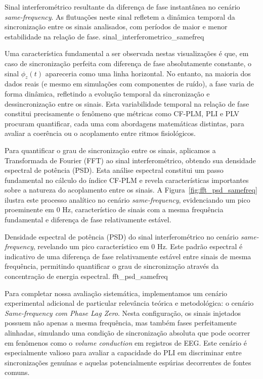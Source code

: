 {Sinal interferométrico resultante da diferença de fase instantânea no cenário \textit{same-frequency}. As flutuações neste sinal refletem a dinâmica temporal da sincronização entre os sinais analisados, com períodos de maior e menor estabilidade na relação de fase.}
{sinal_interferometrico_samefreq}

Uma característica fundamental a ser observada nestas visualizações é que, em caso de sincronização perfeita com diferença de fase absolutamente constante, o sinal \(\phi_z(t)\) apareceria como uma linha horizontal. No entanto, na maioria dos dados reais (e mesmo em simulações com componentes de ruído), a fase varia de forma dinâmica, refletindo a evolução temporal da sincronização e dessincronização entre os sinais. Esta variabilidade temporal na relação de fase constitui precisamente o fenômeno que métricas como CF-PLM, PLI e PLV procuram quantificar, cada uma com abordagens matemáticas distintas, para avaliar a coerência ou o acoplamento entre ritmos fisiológicos.

Para quantificar o grau de sincronização entre os sinais, aplicamos a Transformada de Fourier (FFT) ao sinal interferométrico, obtendo sua densidade espectral de potência (PSD). Esta análise espectral constitui um passo fundamental no cálculo do índice CF-PLM e revela características importantes sobre a natureza do acoplamento entre os sinais. A Figura~\ref{fig:fft_psd_samefreq} ilustra este processo analítico no cenário \textit{same-frequency}, evidenciando um pico proeminente em 0 Hz, característico de sinais com a mesma frequência fundamental e diferença de fase relativamente estável.

{Densidade espectral de potência (PSD) do sinal interferométrico no cenário \textit{same-frequency}, revelando um pico característico em 0 Hz. Este padrão espectral é indicativo de uma diferença de fase relativamente estável entre sinais de mesma frequência, permitindo quantificar o grau de sincronização através da concentração de energia espectral.}
{fft_psd_samefreq}

Para completar nossa avaliação sistemática, implementamos um cenário experimental adicional de particular relevância teórica e metodológica: o cenário \textit{Same-frequency com Phase Lag Zero}. Nesta configuração, os sinais injetados possuem não apenas a mesma frequência, mas também fases perfeitamente alinhadas, simulando uma condição de sincronização absoluta que pode ocorrer em fenômenos como o \textit{volume conduction} em registros de EEG. Este cenário é especialmente valioso para avaliar a capacidade do PLI em discriminar entre sincronizações genuínas e aquelas potencialmente espúrias decorrentes de fontes comuns.

